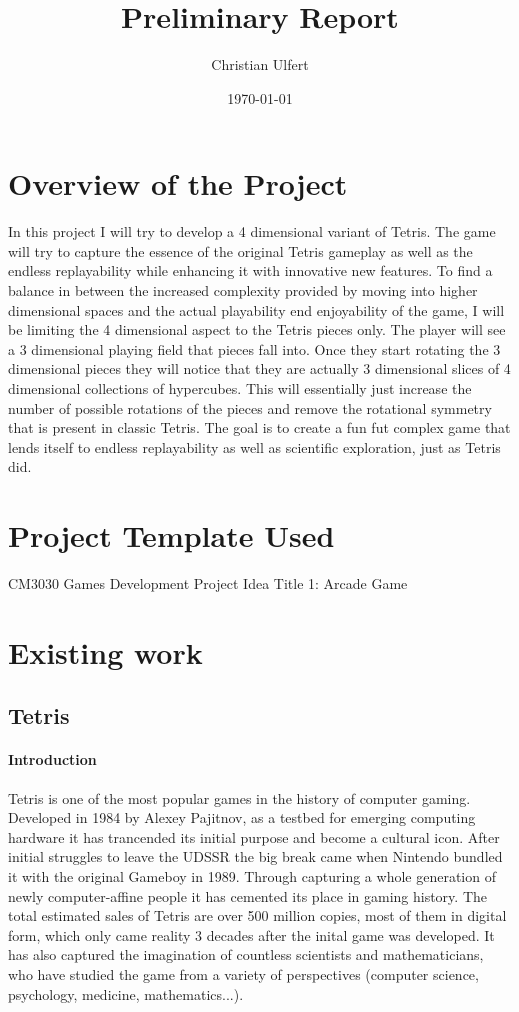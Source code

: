 \documentclass{article}
\title{Preliminary Report}
\author{Christian Ulfert}
\date{\today}
\begin{document}
\maketitle
\newpage
\tableofcontents   
\section{Overview of the Project}

In this project I will try to develop a 4 dimensional variant of Tetris. The game will try to capture the essence of the original Tetris gameplay as well as the endless replayability while enhancing it with innovative new features. To find a balance in between the increased complexity provided by moving into higher dimensional spaces and the actual playability end enjoyability of the game, I will be limiting the 4 dimensional aspect to the Tetris pieces only. The player will see a 3 dimensional playing field that pieces fall into. Once they start rotating the 3 dimensional pieces they will notice that they are actually 3 dimensional slices of 4 dimensional collections of hypercubes. This will essentially just increase the number of possible rotations of the pieces and remove the rotational symmetry that is present in classic Tetris.
The goal is to create a fun fut complex game that lends itself to endless replayability as well as scientific exploration, just as Tetris did.

\section{Project Template Used}
CM3030 Games Development Project Idea Title 1: Arcade Game

\section{Existing work}
\subsection{Tetris}
\paragraph{Introduction}
Tetris is one of the most popular games in the history of computer gaming. Developed in 1984 by Alexey Pajitnov, as a testbed for emerging computing hardware it has trancended its initial purpose and become a cultural icon. 
After initial struggles to leave the UDSSR the big break came when Nintendo bundled it with the original Gameboy in 1989. 
Through capturing a whole generation of newly computer-affine people it has cemented its place in gaming history. The total estimated sales of Tetris are over 500 million copies, most of them in digital form, which only came reality 3 decades after the inital game was developed.
It has also captured the imagination of countless scientists and mathematicians, who have studied the game from a variety of perspectives (computer science, psychology, medicine, mathematics...).
\end{document}
